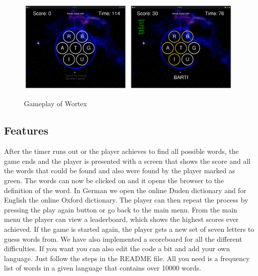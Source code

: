 \documentclass{article}[12pt]
\begin{document}
    
    \begin{figure}[ht]
        \includegraphics[width=0.49\textwidth]{pictures/gameplay.png}
        \includegraphics[width=0.49\textwidth]{pictures/mid_game.png}
        \caption{Gameplay of Wortex}
    \end{figure}

    \subsection*{Features}
    
    After the timer runs out or the player achieves to find all possible words,
    the game ends and the player is presented with a screen that shows the
    score and all the words that could be found and also were found by the
    player marked as green. The words can now be clicked on and it opens the
    browser to the definition of the word. In German we open the online Duden
    dictionary and for English the online Oxford dictionary. The player can
    then repeat the process by pressing the play again button or go back to the
    main menu. From the main menu the player can view a leaderboard, which
    shows the highest scores ever achieved. If the game is started again, the
    player gets a new set of seven letters to guess words from.
    We have also implemented a scoreboard for all the different difficulties.
    If you want you can also edit the code a bit and add your own language. Just
    follow the steps in the README file. All you need is a frequency list of
    words in a given language that contains over 10000 words.
\end{document}
